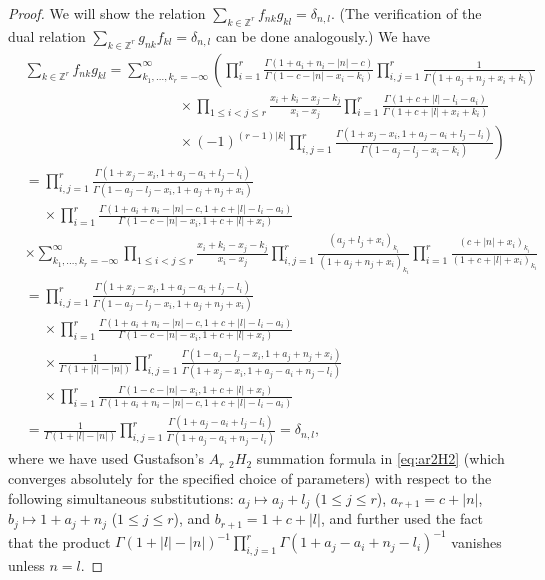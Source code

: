 \documentclass[reqno,12pt]{amsart}
\theoremstyle{remark}
\numberwithin{equation}{section}
\newcommand{\Ga}{\Gamma}
\newcommand{\Z}{\mathbb Z}
\begin{document}
\begin{proof}
We will show the relation $\sum_{k\in\Z^r}f_{nk}g_{kl}=\delta_{n,l}$.
(The verification of the dual relation $\sum_{k\in\Z^r}g_{nk}f_{kl}=\delta_{n,l}$
can be done analogously.) We have
\begin{align*}
  &\sum_{k\in\Z^r}f_{nk}g_{kl}
  =\sum_{k_1,\ldots,k_r=-\infty}^\infty
  \left(\prod_{i=1}^r\frac{\Ga(1+a_i+n_i-|n|-c)}{\Ga(1-c-|n|-x_i-k_i)}
\prod_{i,j=1}^r\frac1{\Ga(1+a_j+n_j+x_i+k_i)}\right.\\
&\qquad\qquad\qquad\qquad\qquad\quad\times
\prod_{1\le i<j\le r}\frac{x_i+k_i-x_j-k_j}{x_i-x_j}
\prod_{i=1}^r\frac{\Ga(1+c+|l|-l_i-a_i)}
{\Ga(1+c+|l|+x_i+k_i)}\\
&\left.\qquad\qquad\qquad\qquad\qquad\quad\times
(-1)^{(r-1)|k|}\prod_{i,j=1}^r\frac{\Ga(1+x_j-x_i,1+a_j-a_i+l_j-l_i)}
{\Ga(1-a_j-l_j-x_i-k_i)}\right)\\
&=\prod_{i,j=1}^r\frac{\Ga(1+x_j-x_i,1+a_j-a_i+l_j-l_i)}
{\Ga(1-a_j-l_j-x_i,1+a_j+n_j+x_i)} \\
  &\quad\;\times
    \prod_{i=1}^r
\frac{\Ga(1+a_i+n_i-|n|-c,1+c+|l|-l_i-a_i)}
{\Ga(1-c-|n|-x_i,1+c+|l|+x_i)}\\
&\times
\sum_{k_1,\ldots,k_r=-\infty}^\infty
\prod_{1\le i<j\le r}\!\!\frac{x_i+k_i-x_j-k_j}{x_i-x_j}
  \prod_{i,j=1}^r\frac{(a_j+l_j+x_i)_{k_i}}{(1+a_j+n_j+x_i)_{k_i}}
 \prod_{i=1}^r\frac{(c+|n|+x_i)_{k_i}}{(1+c+|l|+x_i)_{k_i}}\\
 &=\prod_{i,j=1}^r\frac{\Ga(1+x_j-x_i,1+a_j-a_i+l_j-l_i)}
{\Ga(1-a_j-l_j-x_i,1+a_j+n_j+x_i)} \\
&\quad\;\times\prod_{i=1}^r
\frac{\Ga(1+a_i+n_i-|n|-c,1+c+|l|-l_i-a_i)}
{\Ga(1-c-|n|-x_i,1+c+|l|+x_i)}\\
&\quad\;\times\frac 1{\Ga(1+|l|-|n|)}
\prod_{i,j=1}^r\frac{\Ga(1-a_j-l_j-x_i,1+a_j+n_j+x_i)}
{\Ga(1+x_j-x_i,1+a_j-a_i+n_j-l_i)}\\
&\quad\;\times
\prod_{i=1}^r\frac{\Ga(1-c-|n|-x_i,1+c+|l|+x_i)}
{\Ga(1+a_i+n_i-|n|-c,1+c+|l|-l_i-a_i)}\\
&=\frac 1{\Ga(1+|l|-|n|)}
\prod_{i,j=1}^r\frac{\Ga(1+a_j-a_i+l_j-l_i)}
{\Ga(1+a_j-a_i+n_j-l_i)}=\delta_{n,l},
\end{align*}
where we have used Gustafson's $A_r$ $_2H_2$ summation
formula in \eqref{eq:ar2H2} (which converges absolutely for the
specified choice of parameters) with respect to the
following simultaneous substitutions:
$a_j\mapsto a_j+l_j$ ($1\le j\le r$), $a_{r+1}=c+|n|$,
$b_j\mapsto 1+a_j+n_j$ ($1\le j\le r$), and $b_{r+1}=1+c+|l|$,
and further used the fact that the product
$\Ga(1+|l|-|n|)^{-1}\prod_{i,j=1}^r
\Ga(1+a_j-a_i+n_j-l_i)^{-1}$ vanishes unless $n=l$.
\end{proof}
\end{document}
